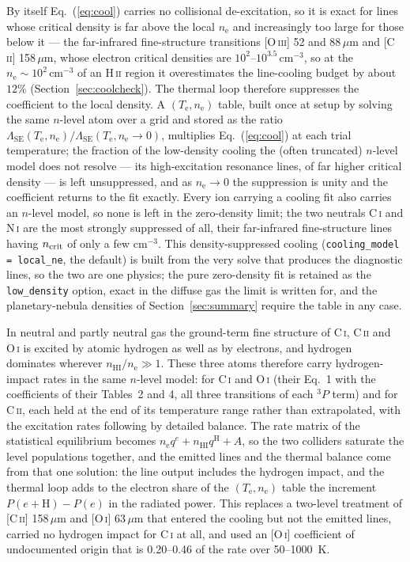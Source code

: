 \documentclass[twocolumn,linenumbers]{aastex702}
\newcommand{\code}[1]{\texttt{#1}}
\newcommand{\HII}{H\,\textsc{ii}}
\newcommand{\Te}{T_{\mathrm{e}}}
\newcommand{\nelec}{n_{\mathrm{e}}}
\begin{document}
By itself Eq.~(\ref{eq:cool}) carries no collisional de-excitation, so it is
exact for lines whose critical density is far above the local $\nelec$ and
increasingly too large for those below it --- the far-infrared
fine-structure transitions [O\,\textsc{iii}] 52 and 88\,$\mu$m and
[C\,\textsc{ii}] 158\,$\mu$m, whose electron critical densities are
$10^{2}$--$10^{3.5}\,\mathrm{cm^{-3}}$, so at the
$\nelec \sim 10^2\,\mathrm{cm^{-3}}$ of an \HII{} region it overestimates
the line-cooling budget by about $12\%$ (Section~\ref{sec:coolcheck}).  The
thermal loop therefore suppresses the coefficient to the local density.  A
$(\Te, \nelec)$ table, built once at setup by solving the same $n$-level
atom over a grid and stored as the ratio
$\Lambda_{\mathrm{SE}}(\Te,\nelec)/\Lambda_{\mathrm{SE}}(\Te,\nelec\!\to\!0)$,
multiplies Eq.~(\ref{eq:cool}) at each trial temperature; the fraction of the
low-density cooling the (often truncated) $n$-level model does not resolve
--- its high-excitation resonance lines, of far higher critical density ---
is left unsuppressed, and as $\nelec\to0$ the suppression is unity and the
coefficient returns to the fit exactly.  Every ion carrying a cooling fit
also carries an $n$-level model, so none is left in the zero-density limit;
the two neutrals C\,\textsc{i} and N\,\textsc{i} are the most strongly
suppressed of all, their far-infrared fine-structure lines having
$n_{\rm crit}$ of only a few $\mathrm{cm^{-3}}$.  This density-suppressed cooling
(\code{cooling\_model = local\_ne}, the default) is built from the very
solve that produces the diagnostic lines, so the two are one physics; the
pure zero-density fit is retained as the \code{low\_density} option, exact
in the diffuse gas the limit is written for, and the planetary-nebula
densities of Section~\ref{sec:summary} require the table in any case.

In neutral and partly neutral gas the ground-term fine structure of
C\,\textsc{i}, C\,\textsc{ii} and O\,\textsc{i} is excited by atomic
hydrogen as well as by electrons, and hydrogen dominates wherever
$n_{\mathrm{HI}}/\nelec \gg 1$.  These three atoms therefore carry
hydrogen-impact rates in the same $n$-level model: \citet{abrahamsson2007}
for C\,\textsc{i} and O\,\textsc{i} (their Eq.~1 with the coefficients of
their Tables~2 and 4, all three transitions of each $^3P$ term) and
\citet{barinovs2005} for C\,\textsc{ii}, each held at the end of its
temperature range rather than extrapolated, with the excitation rates
following by detailed balance.  The rate matrix of the statistical
equilibrium becomes $\nelec q^{e} + n_{\mathrm{HI}}q^{\mathrm{H}} + A$, so the
two colliders saturate the level populations together, and the emitted
lines and the thermal balance come from that one solution: the line output
includes the hydrogen impact, and the thermal loop adds to the electron
share of the $(\Te, \nelec)$ table the increment $P(e + \mathrm{H}) - P(e)$
in the radiated power.  This replaces a two-level treatment of
[C\,\textsc{ii}] 158\,$\mu$m and [O\,\textsc{i}] 63\,$\mu$m that entered
the cooling but not the emitted lines, carried no hydrogen impact for
C\,\textsc{i} at all, and used an [O\,\textsc{i}] coefficient of
undocumented origin that is 0.20--0.46 of the \citet{abrahamsson2007} rate
over 50--1000~K.
\end{document}
